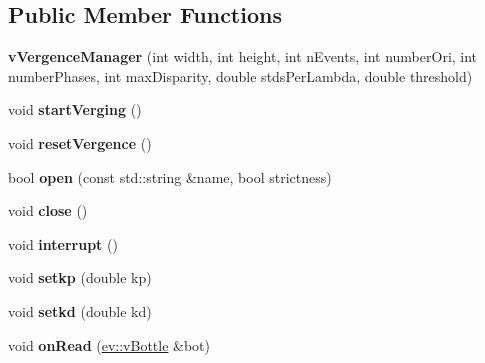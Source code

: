 \subsection*{Public Member Functions}
\begin{DoxyCompactItemize}
\item 
{\bfseries v\+Vergence\+Manager} (int width, int height, int n\+Events, int number\+Ori, int number\+Phases, int max\+Disparity, double stds\+Per\+Lambda, double threshold)\hypertarget{classvVergenceManager_a1a6f52d8f4cb48555ce78a46f18fb6bd}{}\label{classvVergenceManager_a1a6f52d8f4cb48555ce78a46f18fb6bd}

\item 
void {\bfseries start\+Verging} ()\hypertarget{classvVergenceManager_ab81f067e0c77e52466d0fa286f2998eb}{}\label{classvVergenceManager_ab81f067e0c77e52466d0fa286f2998eb}

\item 
void {\bfseries reset\+Vergence} ()\hypertarget{classvVergenceManager_ae9a760ac725054c4d7a54c59043c2e5d}{}\label{classvVergenceManager_ae9a760ac725054c4d7a54c59043c2e5d}

\item 
bool {\bfseries open} (const std\+::string \&name, bool strictness)\hypertarget{classvVergenceManager_a426ca10e1feef76e4290c697eced6b47}{}\label{classvVergenceManager_a426ca10e1feef76e4290c697eced6b47}

\item 
void {\bfseries close} ()\hypertarget{classvVergenceManager_a9b8f1b2639f222fc280c20719f8959af}{}\label{classvVergenceManager_a9b8f1b2639f222fc280c20719f8959af}

\item 
void {\bfseries interrupt} ()\hypertarget{classvVergenceManager_aa6cc4cf8270c835e8bbe86ef382eb3dd}{}\label{classvVergenceManager_aa6cc4cf8270c835e8bbe86ef382eb3dd}

\item 
void {\bfseries setkp} (double kp)\hypertarget{classvVergenceManager_a1d4eff6ba5353bf2fcffaae2c9bab539}{}\label{classvVergenceManager_a1d4eff6ba5353bf2fcffaae2c9bab539}

\item 
void {\bfseries setkd} (double kd)\hypertarget{classvVergenceManager_a9b51d753f0f118faa786361b6853f4b5}{}\label{classvVergenceManager_a9b51d753f0f118faa786361b6853f4b5}

\item 
void {\bfseries on\+Read} (\hyperlink{classev_1_1vBottle}{ev\+::v\+Bottle} \&bot)\hypertarget{classvVergenceManager_a19c62351b2585b6745b171f5a2a36503}{}\label{classvVergenceManager_a19c62351b2585b6745b171f5a2a36503}

\end{DoxyCompactItemize}


